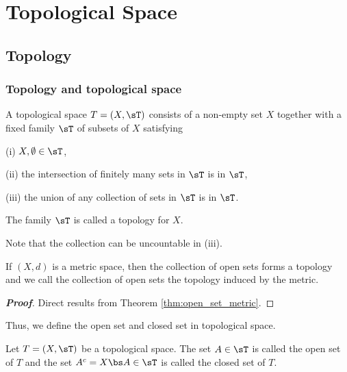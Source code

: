 \chapter{Topological Space}

\section{Topology}

\subsection{Topology and topological space}

\begin{definition}
A topological space $T= (X,\sT)$ consists of a non-empty set $X$ together with a fixed family $\sT$ of subsets of $X$ satisfying
\ben
\item [(i)] $X,\emptyset \in \sT$,
\item [(ii)] the intersection of finitely many sets in $\sT$ is in $\sT$,
\item [(iii)] the union of any collection of sets in $\sT$ is in $\sT$.
\een

The family $\sT$ is called a topology for $X$.
\end{definition}

\begin{remark}
Note that the collection can be uncountable in (iii).
\end{remark}

\begin{proposition}
If $(X,d)$ is a metric space, then the collection of open sets forms a topology and we call the collection of open sets the topology induced by the metric.
\end{proposition}

\begin{proof}[\bf Proof]
Direct results from Theorem \ref{thm:open_set_metric}.
\end{proof}

Thus, we define the open set and closed set in topological space.

\begin{definition}
Let $T=(X,\sT)$ be a topological space. The set $A \in \sT$ is called the open set of $T$ and the set $A^c = X\bs A\in \sT$ is called the closed set of $T$.
\end{definition}

